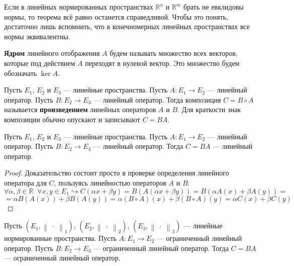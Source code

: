 \documentclass[11pt]{article}
\begin{document}
\begin{remark}
    Если в линейных нормированных пространствах $\mathbb{R}^n$ и $\mathbb{R}^m$ брать не евклидовы нормы, то теорема всё равно останется справедливой. Чтобы это понять, достаточно лишь вспомнить, 
    что в конечномерных линейных пространствах все нормы эквивалентны.
\end{remark}

\begin{definition}
    \textbf{Ядром} линейного отображения $A$ будем называть множество всех векторов, которые под действием $A$ переходят в нулевой вектор.
    Это множество будем обозначать $\ker A$.
\end{definition}

\begin{definition}
    Пусть $E_1$, $E_2$ и $E_3$ --- линейные пространства. Пусть $A \colon E_1 \to E_2$ --- линейный оператор. Пусть $B \colon E_2 \to E_3$ --- линейный оператор. Тогда композиция $C = B \circ A$ называется \textbf{произведением} линейных операторов $A$ и $B$.
    Для краткости знак композиции обычно опускают и записывают $C = BA$.
\end{definition}

\begin{lemma} \label{lemma:1.1}
    Пусть $E_1$, $E_2$ и $E_3$ --- линейные пространства. Пусть $A \colon E_1 \to E_2$ --- линейный оператор. Пусть $B \colon E_2 \to E_3$ --- линейный оператор. Тогда $C = BA$ --- линейный оператор.
\end{lemma}

\begin{proof}
    Доказательство состоит просто в проверке определения линейного оператора для $C$, пользуясь 
    линейностью операторов $A$ и $B$:
    \begin{equation*}
        \forall \alpha, \beta \in \mathbb{R} \; \; \forall x, y \in E_1 \hookrightarrow
        C(\alpha x + \beta y) = B\left(A\left(\alpha x + \beta y\right)\right) = B\left(\alpha A(x) + \beta A(y)\right) =
    \end{equation*}
    \begin{equation*}
        = \alpha B\left(A(x)\right) + \beta B\left(A(y)\right) = \alpha \left(B \circ A\right)(x) + \beta \left(B \circ A\right)(y) = \alpha C(x) + \beta C(y)
    \end{equation*}
\end{proof}

\begin{lemma}
    Пусть $\left(E_1, \left\lVert \; \cdot \; \right\rVert_1 \right)$, $\left(E_2, \left\lVert \; \cdot \; \right\rVert_2 \right)$, $\left(E_3, \left\lVert \; \cdot \; \right\rVert_3 \right)$ --- линейные нормированные пространства. 
    Пусть $A \colon E_1 \to E_2$ --- ограниченный линейный оператор. Пусть $B \colon E_2 \to E_3$ --- ограниченный линейный оператор. Тогда $C = BA$ --- ограниченный линейный оператор.
\end{lemma}
\end{document}
